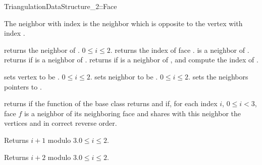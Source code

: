 \begin{ccRefConcept}{TriangulationDataStructure_2::Face}

The neighbor with index  is the neighbor which is opposite
to the vertex with index .


{returns  the neighbor  of \ccVar. 
\ccPrecond $0\leq i \leq 2$.
}
\ccGlue
{}
{returns the index of face .
\ccPrecond {} is a neighbor of \ccVar.}
\ccGlue
{}
{returns  if  is a neighbor of \ccVar.}
\ccGlue
{}
{returns  if  is a neighbor of \ccVar,  and
compute the index  of .}



\begin{ccAdvanced}

{sets vertex  to be .
\ccPrecond $0\leq i \leq 2$.
}
\ccGlue
{}
{sets neighbor  to be .
\ccPrecond $0\leq i \leq 2$.
}
\ccGlue
{}
\ccGlue
{}
\ccGlue
{} {sets the neighbors pointers to .}
\ccGlue
{}



{returns  if  the function 
 of the base class
returns  and if, for each index $i$, $0 \le i < 3$,
face $f$ is a neighbor of its neighboring face 
and shares with this neighbor the  vertices  and 
in correct reverse order.}

\end{ccAdvanced}


{Returns $i+1$ modulo 3.\ccPrecond $0\leq i \leq 2$.}

{Returns $i+2$ modulo 3.\ccPrecond $0\leq i \leq 2$.}


\end{ccRefConcept}
